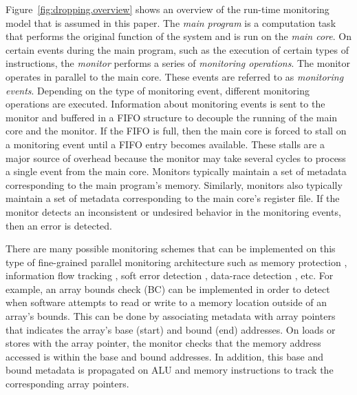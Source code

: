 Figure~\ref{fig:dropping.overview} shows an overview of the run-time monitoring
model that is assumed in this paper.  The \emph{main program} is a computation
task that performs the original function of the system and is run on the
\emph{main core}.  On certain events during the main program, such as the
execution of certain types of instructions, the \emph{monitor} performs a
series of \emph{monitoring operations}. The monitor operates in parallel to the
main core. These events are referred to as \emph{monitoring events}. Depending
on the type of monitoring event, different monitoring operations are
executed. Information about monitoring events is sent to the monitor and buffered in a FIFO structure to decouple the
running of the main core and the monitor. If the FIFO is full, then the main
core is forced to stall on a monitoring event until a FIFO entry becomes
available. These stalls are a major source of
overhead because the monitor may take several cycles to process a single event
from the main core. 
Monitors typically maintain a set of metadata corresponding to the main
program's memory. Similarly, monitors also typically maintain a set of metadata
corresponding to the main core's register file.
If the monitor
detects an inconsistent or undesired behavior in the monitoring events, then
an error is detected. 

There are many possible monitoring schemes that can be implemented on this type
of fine-grained parallel monitoring architecture such as memory protection
\cite{mondrian-asplos02}, information flow tracking \cite{dift-asplos04,
testudo-micro08}, soft error detection \cite{argus-micro07}, data-race
detection \cite{cord-hpca06}, etc.  For example, an array bounds check (BC)
\cite{hardbound-asplos08} can be implemented in order to detect
when software attempts to read or write to a memory location outside of an
array's bounds. This can be done by associating metadata with array pointers that 
indicates the array's base (start) and bound (end) addresses. On loads or stores with the
array
pointer, the monitor checks that the memory address accessed is within the base and
bound addresses. In addition, this base and bound metadata
is propagated on ALU and memory instructions to track the corresponding array pointers.

